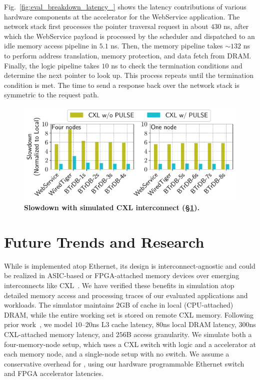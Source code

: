Fig.~\ref{fig:eval_breakdown_latency_} shows the latency contributions of various hardware components at the \pulse accelerator for the WebService application. The network stack first processes the pointer traversal request in about $430$ ns, after which the WebService payload is processed by the scheduler and dispatched to an idle memory access pipeline in $5.1$ ns. Then, the memory pipeline takes $\sim$$132$ ns to perform address translation, memory protection, and data fetch from DRAM. Finally, the logic pipeline takes $10$ ns to check the termination conditions and determine the next pointer to look up. This process repeats until the termination condition is met. The time to send a response back over the network stack is symmetric to the request path.












\begin{figure}[t]
\centering
\includegraphics[width=0.9\columnwidth]{fig/pulse/cxl.pdf}
\vspace{-1em}
\caption[Slowdown with simulated CXL interconnect]{\textbf{Slowdown with simulated CXL interconnect (\S\ref{sec:future}).} }

\label{fig:eval_cxl}
\end{figure}

\section{Future Trends and Research}
\label{sec:future}


While \pulse is implemented atop Ethernet, its design is interconnect-agnostic and could be realized in ASIC-based or FPGA-attached memory devices over emerging interconnects like CXL~\cite{cxl, cxl_azure, sun2023demystifying}. We have verified these benefits in simulation atop detailed memory access and processing traces of our evaluated applications and workloads. The simulator maintains $2$GB of cache in local (CPU-attached) DRAM, while the entire working set is stored on remote CXL memory. Following prior work~\cite{pond}, we model $10$--$20$ns L3 cache latency, $80$ns local DRAM latency, $300$ns CXL-attached memory latency, and $256$B access granularity. We simulate both a four-memory-node setup, which uses a CXL switch with \pulse logic and a \pulse accelerator at each memory node, and a single-node setup with no switch. We assume a conservative overhead for \pulse, using our hardware programmable Ethernet switch and FPGA accelerator latencies.
 
